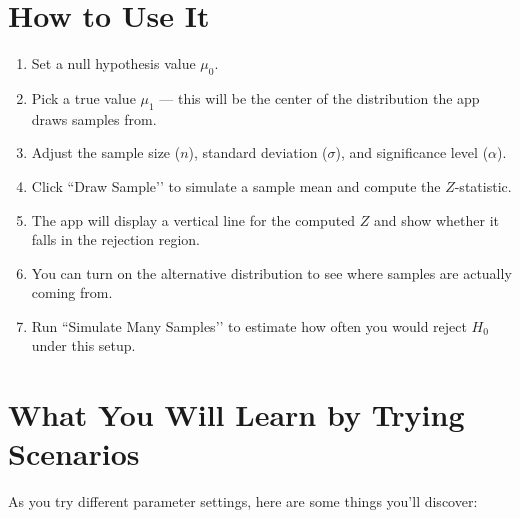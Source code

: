 \documentclass[11pt]{article}
\begin{document}
\section*{How to Use It}

\begin{enumerate}
  \item Set a null hypothesis value $\mu_0$.
  \item Pick a true value $\mu_1$ — this will be the center of the distribution the app draws samples from.
  \item Adjust the sample size ($n$), standard deviation ($\sigma$), and significance level ($\alpha$).
  \item Click ``Draw Sample’’ to simulate a sample mean and compute the $Z$-statistic.
  \item The app will display a vertical line for the computed $Z$ and show whether it falls in the rejection region.
  \item You can turn on the alternative distribution to see where samples are actually coming from.
  \item Run ``Simulate Many Samples’’ to estimate how often you would reject $H_0$ under this setup.
\end{enumerate}

\section*{What You Will Learn by Trying Scenarios}

As you try different parameter settings, here are some things you’ll discover:
\end{document}
